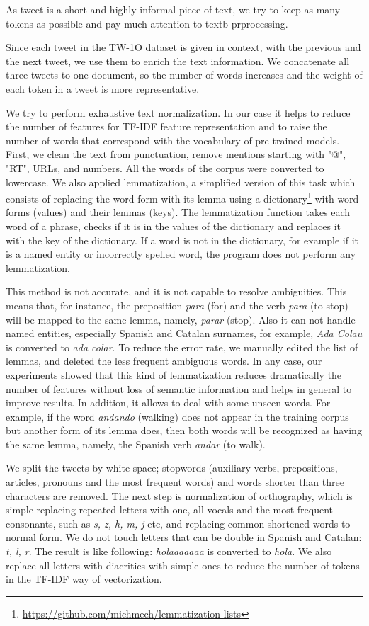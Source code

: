 \documentclass[10pt, a4paper]{article}
\begin{document}
As  tweet is a short and highly informal piece of text, we try to keep as many tokens as possible and pay much attention to textb prprocessing.  

Since each tweet in the TW-1O dataset is given in context, with the previous and the next tweet, we use them to enrich the text information. We concatenate all three tweets to one document, so the number of words increases and the weight of each token in a tweet is more representative.   

We try to perform exhaustive text normalization. In our case it helps to reduce the number of features for TF-IDF feature representation and to raise the number of words that correspond with the vocabulary of pre-trained models. First, we clean the text from punctuation, remove mentions starting with "@", "RT", URLs, and numbers. All the words of the corpus were converted to lowercase. We also applied lemmatization, a simplified version of this task which consists of replacing the word form with its lemma using a dictionary\footnote{\url{https://github.com/michmech/lemmatization-lists}} with word forms (values) and their lemmas (keys). The lemmatization function takes each word of a phrase, checks if it is in the values of the dictionary and replaces it with the key of the dictionary. If a word is not in the dictionary, for example if it is a named entity or incorrectly spelled word, the program does not perform any lemmatization. 

This method is not accurate, and it is not capable to resolve ambiguities. This means that, for instance, the preposition \textit{para} (for) and the verb \textit{para} (to stop) will be mapped to the same lemma, namely, \textit{parar} (stop). Also it can not handle named entities, especially Spanish and Catalan surnames, for example, \textit{Ada Colau} is converted to \textit{ada colar}. To reduce the error rate, we manually edited the list of lemmas, and deleted the less frequent ambiguous words. In any case, our experiments showed that this kind of lemmatization reduces dramatically the number of features without loss of semantic information and helps in general to improve results. In addition, it allows to deal with some unseen words. For example, if the word \textit{andando} (walking) does not appear in the training corpus but another form of its lemma does, then both words will be recognized as having the same lemma, namely, the Spanish verb \textit{andar} (to walk).

We split the tweets by white space; stopwords (auxiliary verbs, prepositions, articles, pronouns and the most frequent words) and words shorter than three characters are removed. The next step is normalization of orthography, which is simple replacing repeated letters with one, all vocals and the most frequent consonants, such as \textit{s, z, h, m, j} etc, and replacing common shortened words to normal form. We do not touch letters that can be double in Spanish and Catalan: \textit{t, l, r}.  The result is like following: \textit{holaaaaaaa} is converted to \textit{hola}. We also replace all letters with diacritics with simple ones to reduce the number of tokens in the TF-IDF way of vectorization. 
\end{document}

